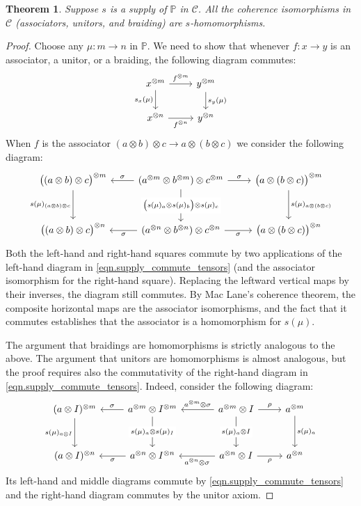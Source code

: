 \documentclass[11pt, oneside, article]{memoir}
\theoremstyle{plain}
\newtheorem{theorem}{Theorem}[chapter]
\theoremstyle{definition}
\theoremstyle{remark}
\newcommand{\cat}[1]{\mathcal{#1}}%
\newcommand{\tpow}[1]{^{\otimes #1}}
\newcommand{\pp}{\mathbb{P}}
\begin{document}
\begin{theorem}\label{thm.coherence_isos_homos}
Suppose $s$ is a supply of $\pp$ in $\cat{C}$. All the coherence isomorphisms in $\cat{C}$ (associators, unitors, and braiding) are $s$-homomorphisms.
\end{theorem}
\begin{proof}
Choose any $\mu\colon m\to n$ in $\pp$. We need to show that whenever $f\colon x\to y$ is an associator, a unitor, or a braiding, the following diagram commutes:
\[
 \begin{tikzcd}
	x\tpow{m}\ar[d, "s_x(\mu)"']\ar[r, "f\tpow{m}"]&
	y\tpow{m}\ar[d, "s_y(\mu)"]\\
	x\tpow{n}\ar[r, "f\tpow{n}"']&
	y\tpow{n}
\end{tikzcd}
\]
When $f$ is the associator $(a\otimes b)\otimes c\to a\otimes (b\otimes c)$ we consider the following diagram:
\[
\begin{tikzcd}[row sep=30pt]
  \big((a\otimes b)\otimes c\big)\tpow{m}\ar[d, "s(\mu)_{(a\otimes b)\otimes c}"']&
  (a\tpow{m}\otimes b\tpow{m})\otimes c\tpow{m}\ar[l, "\sigma"']\ar[r, "\sigma"]\ar[d, "\big(s(\mu)_a\otimes s(\mu)_b\big)\otimes s(\mu)_c" description]&
  \big(a\otimes (b\otimes c)\big)\tpow{m}\ar[d, "s(\mu)_{a\otimes (b\otimes c)}"]\\
  \big((a\otimes b)\otimes c\big)\tpow{n}&
  (a\tpow{n}\otimes b\tpow{n})\otimes c\tpow{n}\ar[l, "\sigma"]\ar[r, "\sigma"']&
  \big(a\otimes (b\otimes c)\big)\tpow{n}
\end{tikzcd}
\]
Both the left-hand and right-hand squares commute by two applications of the left-hand diagram in \cref{eqn.supply_commute_tensors} (and the associator isomorphism for the right-hand square). Replacing the leftward vertical maps by their inverses, the diagram still commutes. By Mac Lane's coherence theorem, the composite horizontal maps are the associator isomorphisms, and the fact that it commutes establishes that the associator is a homomorphism for $s(\mu)$.

The argument that braidings are homomorphisms is strictly analogous to the above. The argument that unitors are homomorphisms is almost analogous, but the proof requires also the commutativity of the right-hand diagram in \cref{eqn.supply_commute_tensors}. Indeed, consider the following diagram:
\[
\begin{tikzcd}[row sep=30pt]
	(a\otimes I)\tpow{m}\ar[d, "s(\mu)_{a\otimes I}"']&
	a\tpow{m}\otimes I\tpow{m}\ar[d, "s(\mu)_a\otimes s(\mu)_I" description]\ar[l, "\sigma"']&[10pt]
	a\tpow{m}\otimes I\ar[d, "s(\mu)_a\otimes I" description]\ar[r, "\rho"]\ar[l, "a\tpow{m}\otimes\sigma"']&
	a\tpow{m}\ar[d, "s(\mu)_a"]\\
	(a\otimes I)\tpow{n}&
	a\tpow{n}\otimes I\tpow{n}\ar[l, "\sigma"]&
	a\tpow{n}\otimes I\ar[l, "a\tpow{n}\otimes\sigma"]\ar[r, "\rho"']&
	a\tpow{n}
\end{tikzcd}
\]
Its left-hand and middle diagrams commute by \cref{eqn.supply_commute_tensors} and the right-hand diagram commutes by the unitor axiom.
\end{proof}
\end{document}

